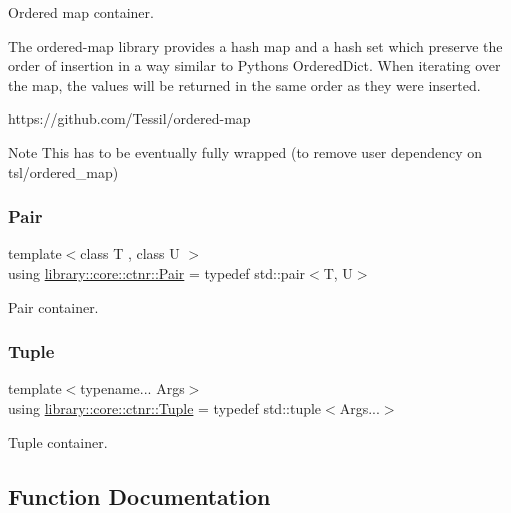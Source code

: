 Ordered map container. 

The ordered-\/map library provides a hash map and a hash set which preserve the order of insertion in a way similar to Python\textquotesingle{}s Ordered\+Dict. When iterating over the map, the values will be returned in the same order as they were inserted.

https\+://github.com/\+Tessil/ordered-\/map \begin{DoxyNote}{Note}
This has to be eventually fully wrapped (to remove user dependency on tsl/ordered\+\_\+map) 
\end{DoxyNote}
\mbox{\label{namespacelibrary_1_1core_1_1ctnr_aad6f8de4c0f279c10436d59d4ace74bd}} 
\subsubsection{\texorpdfstring{Pair}{Pair}}
{\footnotesize\ttfamily template$<$class T , class U $>$ \\
using \hyperlink{namespacelibrary_1_1core_1_1ctnr_aad6f8de4c0f279c10436d59d4ace74bd}{library\+::core\+::ctnr\+::\+Pair} = typedef std\+::pair$<$T, U$>$}



Pair container. 

\mbox{\label{namespacelibrary_1_1core_1_1ctnr_a551ef72e2adb570c4d6bdf5e1bbc96b9}} 
\subsubsection{\texorpdfstring{Tuple}{Tuple}}
{\footnotesize\ttfamily template$<$typename... Args$>$ \\
using \hyperlink{namespacelibrary_1_1core_1_1ctnr_a551ef72e2adb570c4d6bdf5e1bbc96b9}{library\+::core\+::ctnr\+::\+Tuple} = typedef std\+::tuple$<$Args...$>$}



Tuple container. 



\subsection{Function Documentation}
\mbox{\label{namespacelibrary_1_1core_1_1ctnr_a96a0b941c0de59772cb5e073d0c2b8a8}} 
